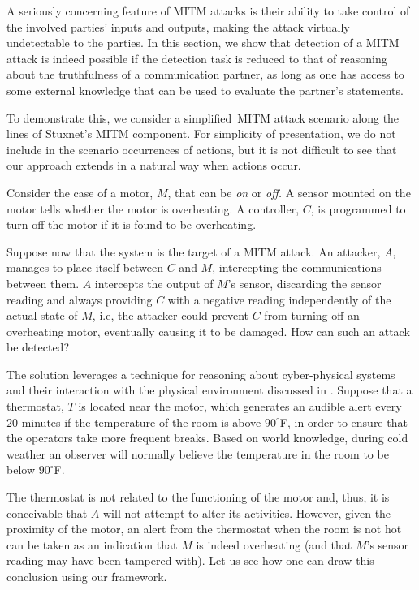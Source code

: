 \documentclass{article}
\begin{document}
A seriously concerning feature of MITM attacks is their ability to take control of the involved parties' inputs and outputs, making the attack virtually undetectable to the parties. In this section, we show that detection of a MITM attack is indeed possible if the detection task is reduced to that of reasoning about the truthfulness of a communication partner, as long as one has access to some external knowledge that can be used 
to evaluate
the partner's statements.

To demonstrate this, we consider a simplified\ MITM attack scenario along the lines of Stuxnet's MITM component. For simplicity of presentation, we do not include in the scenario occurrences of actions, but it is not difficult to see that our approach extends in a natural way when actions occur.  %


Consider the case of a motor, $M$, that can be \emph{on} or \emph{off.} A sensor mounted on the motor tells whether the motor is overheating. A controller, $C$, is programmed to turn off the motor if it is found to be overheating.

Suppose now that the system is the target of a MITM attack. An attacker, $A$, manages to place itself between $C$ and $M$, intercepting the communications between them. $A$ intercepts the output of $M$'s sensor, discarding the sensor reading and always providing $C$ with a negative reading independently of the actual state of $M$, i.e, %
the attacker could prevent $C$ from turning off an overheating motor, eventually causing it to be %
damaged. How can such an attack be detected?

The solution leverages a technique for reasoning about cyber-physical systems and their interaction with the physical environment discussed in \cite{nb15}. Suppose that a thermostat, $T$ is  located near the motor,  which generates an audible alert every $20$ minutes if the temperature of the room is above $90^\circ$F, in order to ensure that the operators take more frequent breaks. Based on world knowledge, during cold weather an observer will normally believe the temperature in the room to be below $90^\circ$F.
 

The thermostat is not related to the functioning of the motor and, thus, it is conceivable that $A$ will not attempt to alter its activities.
However, given the proximity of the motor, an alert from the thermostat when the room is not hot can be taken as an indication that $M$ is indeed overheating (and that $M$'s sensor reading may have been tampered with). Let us see how one can draw this conclusion using our framework.
\end{document}
